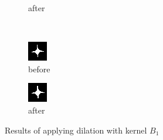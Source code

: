 \documentclass[12pt]{article}
\renewcommand{\subfiguresize}{.25\textwidth}
\begin{document}
\begin{figure}[H]
\begin{subfigure}[t]{\subfiguresize}
        \caption{after}
    \end{subfigure}\\[1em]
    \begin{subfigure}[t]{\subfiguresize}\centering
        \includegraphics[width=\textwidth]{img/image2.png}
        \caption{before}
    \end{subfigure}
    \hspace{2em}
    \begin{subfigure}[t]{\subfiguresize}\centering
        \includegraphics[width=\textwidth]{img/image2-dilation-b1.png}
        \caption{after}
    \end{subfigure}
    \caption{Results of applying dilation with kernel $B_1$}
\end{figure}   
\end{document}
